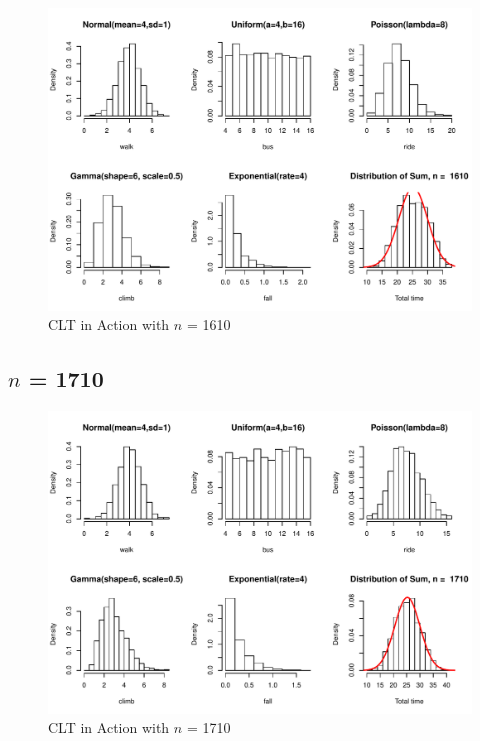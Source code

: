 \documentclass[11pt,letter]{article}\usepackage[]{graphicx}\usepackage[]{color}
\makeatletter
\def\maxwidth{ %
  \ifdim\Gin@nat@width>\linewidth
    \linewidth
  \else
    \Gin@nat@width
  \fi
}
\newenvironment{knitrout}{}{} %
\makeatother
\begin{document}
\begin{knitrout}
\color{fgcolor}\begin{figure}[h]

{\centering \includegraphics[width=\maxwidth]{figure/n-1610-1} 

}

\caption[CLT in Action with ]{CLT in Action with $n$ = 1610}\label{fig:n-1610}
\end{figure}


\end{knitrout}
\newpage
\subsection{$n$ = 1710}

\begin{knitrout}
\color{fgcolor}\begin{figure}[h]

{\centering \includegraphics[width=\maxwidth]{figure/n-1710-1} 

}

\caption[CLT in Action with ]{CLT in Action with $n$ = 1710}\label{fig:n-1710}
\end{figure}


\end{knitrout}
\newpage
\end{document}
